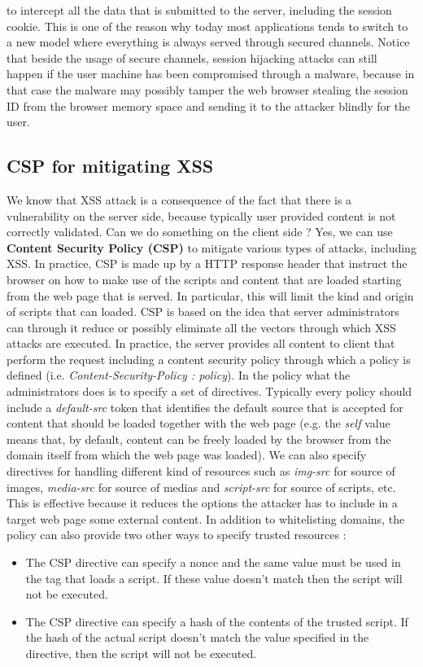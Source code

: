 to intercept all the data that is submitted to the server, including the session cookie. This is one of the reason why today most applications tends to switch to a new model where everything is always served through secured channels. Notice that beside the usage of secure channels, session hijacking attacks can still happen if the user machine has been compromised through a malware, because in that case the malware may possibly tamper the web browser stealing the session ID from the browser memory space and sending it to the attacker blindly for the user.

\subsection{CSP for mitigating XSS}
We know that XSS attack is a consequence of the fact that there is a vulnerability on the server side, because typically user provided content is not correctly validated. Can we do something on the client side ? Yes, we can use \textbf{Content Security Policy (CSP)} to mitigate various types of attacks, including XSS. In practice, CSP is made up by a HTTP response header that instruct the browser on how to make use of the scripts and content that are loaded starting from the web page that is served. In particular, this will limit the kind and origin of scripts that can loaded. CSP is based on the idea that server administrators can through it reduce or possibly eliminate all the vectors through which XSS attacks are executed. In practice, the server provides all content to client that perform the request including a content security policy through which a policy is defined (i.e. \textit{Content-Security-Policy : policy}). In the policy what the administrators does is to specify a set of directives. Typically every policy should include a \textit{default-src} token that identifies the default source that is accepted for content that should be loaded together with the web page (e.g. the \textit{self} value means that, by default, content can be freely loaded by the browser from the domain itself from which the web page was loaded). We can also specify directives for handling different kind of resources such as \textit{img-src} for source of images, \textit{media-src} for source of medias and \textit{script-src} for source of scripts, etc. This is effective because it reduces the options the attacker has to include in a target web page some external content. In addition to whitelisting domains, the policy can also provide two other ways to specify trusted resources :
\begin{itemize}
\item The CSP directive can specify a nonce and the same value must be used in the tag that loads a script. If these value doesn't match then the script will not be executed.
\item The CSP directive can specify a hash of the contents of the trusted script. If the hash of the actual script doesn't match the value specified in the directive, then the script will not be executed.
\end{itemize}

